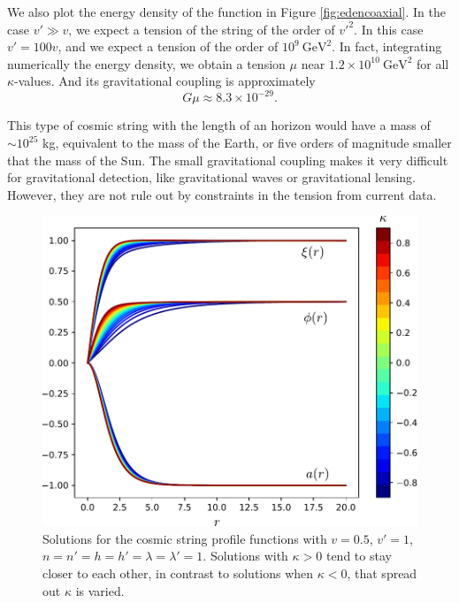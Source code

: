 We also plot the energy density of the function in Figure \ref{fig:edencoaxial}. In the case $v'\gg v$, we expect a tension of the string of the order of $v'^2$. In this case $v' = 100v$, and we expect a tension of the order of $10^9 \ \text{GeV}^2$. In fact, integrating numerically the energy density, we obtain a tension $\mu$ near $1.2\times 10^{10}\ \text{GeV}^2$ for all $\kappa$-values. And its gravitational coupling is approximately
\begin{equation}
	G\mu \approx 8.3\times 10^{-29}.
\end{equation}

 This type of cosmic string with the length of an horizon would have a mass of $\sim 10^{25}$ kg, equivalent to the mass of the Earth, or five orders of magnitude smaller that the mass of the Sun. The small gravitational coupling makes it very difficult for gravitational detection, like gravitational waves or gravitational lensing. However, they are not rule out by constraints in the tension from current data.

\begin{figure}
	\centering
	\includegraphics[scale=1]{./figures/F0.pdf}
	\caption{Solutions for the cosmic string profile functions with $v = 0.5$, $v'=1$, $n=n'=h=h'=\lambda=\lambda'=1$. Solutions with $\kappa>0$ tend to stay closer to each other, in contrast to solutions when $\kappa<0$, that spread out $\kappa$ is varied.}
	\label{fig:fig1}
\end{figure}


